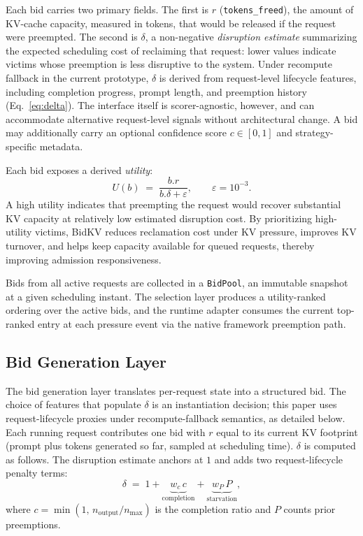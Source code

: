 \documentclass[sigconf,nonacm]{acmart}
\newcommand{\bidkv}{BidKV\xspace}
\newcommand{\utilfn}{\ensuremath{U}}
\newcommand{\tokfree}{\ensuremath{r}}
\newcommand{\qualdelta}{\ensuremath{\delta}}
\newcommand{\stabeps}{\ensuremath{\varepsilon}}
\begin{document}
Each bid carries two primary fields. The first is $\tokfree$
(\texttt{tokens\_freed}), the amount of KV-cache capacity, measured in tokens,
that would be released if the request were preempted. The second is
$\qualdelta$, a non-negative \emph{disruption estimate} summarizing the
expected scheduling cost of reclaiming that request: lower values indicate
victims whose preemption is less disruptive to the system. Under recompute
fallback in the current prototype, $\qualdelta$ is derived from request-level
lifecycle features, including completion progress, prompt length, and
preemption history (Eq.~\ref{eq:delta}). The interface itself is
scorer-agnostic, however, and can accommodate alternative request-level
signals without architectural change. A bid may additionally carry an optional
confidence score $c \in [0,1]$ and strategy-specific metadata.

Each bid exposes a derived \emph{utility}:
\begin{equation}\label{eq:utility}
  \utilfn(b) \;=\; \frac{b.\tokfree}{b.\qualdelta + \stabeps},
  \qquad \stabeps = 10^{-3}.
\end{equation}
A high utility indicates that preempting the request would recover substantial
KV capacity at relatively low estimated disruption cost. By prioritizing
high-utility victims, \bidkv reduces reclamation cost under KV pressure,
improves KV turnover, and helps keep capacity available for queued requests,
thereby improving admission responsiveness.

Bids from all active requests are collected in a \texttt{BidPool}, an
immutable snapshot at a given scheduling instant. The selection layer produces
a utility-ranked ordering over the active bids, and the runtime adapter
consumes the current top-ranked entry at each pressure event via the native
framework preemption path.

\subsection{Bid Generation Layer}\label{sec:design:scoring}

The bid generation layer translates per-request state into a structured bid.
The choice of features that populate $\qualdelta$ is an instantiation decision;
this paper uses request-lifecycle proxies under recompute-fallback semantics,
as detailed below.  Each running request contributes one bid with
$\tokfree$ equal to its current KV footprint (prompt plus tokens generated
so far, sampled at scheduling time).  $\qualdelta$ is computed as follows.
The disruption estimate anchors at $1$ and adds two
request-lifecycle penalty terms:
\begin{equation}\label{eq:delta}
  \qualdelta \;=\; 1
    + \underbrace{w_c\, c}_{\text{completion}}
    + \underbrace{w_P\, P}_{\text{starvation}},
\end{equation}
where $c{=}\min(1,\, n_{\text{output}}/n_{\max})$ is the completion
ratio and $P$ counts prior preemptions.
\end{document}
